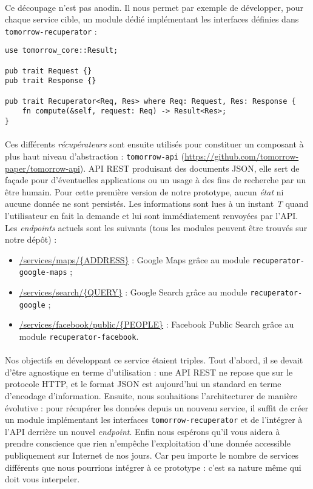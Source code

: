 \paragraph{} Ce découpage n'est pas anodin. Il nous permet par exemple de développer, pour chaque service cible, un module
dédié implémentant les interfaces définies dans \lstinline{tomorrow-recuperator}  :

\begin{lstlisting}
use tomorrow_core::Result;

pub trait Request {}
pub trait Response {}

pub trait Recuperator<Req, Res> where Req: Request, Res: Response {
    fn compute(&self, request: Req) -> Result<Res>;
}\end{lstlisting}

\paragraph{} Ces différents \emph{récupérateurs} sont ensuite utilisés pour constituer un composant à plus haut niveau
d'abstraction : \lstinline{tomorrow-api} (\url{https://github.com/tomorrow-paper/tomorrow-api}). API REST produisant des
documents JSON, elle sert de façade pour d'éventuelles applications ou un usage à des fins de recherche par un être humain. 
Pour cette première version de notre prototype, aucun \emph{état} ni aucune donnée ne sont persistés. Les informations 
sont lues à un instant \emph{T} quand l'utilisateur en fait la demande et lui sont immédiatement renvoyées par l'API.
Les \emph{endpoints} actuels sont les suivants (tous les modules peuvent être trouvés sur notre dépôt) :

\begin{itemize}
    \item \url{/services/maps/{ADDRESS}} : Google Maps grâce au module \lstinline{recuperator-google-maps} ;
    \item \url{/services/search/{QUERY}} : Google Search grâce au module \lstinline{recuperator-google} ;
    \item \url{/services/facebook/public/{PEOPLE}} : Facebook Public Search grâce au module \lstinline{recuperator-facebook}.
\end{itemize}

\paragraph{} Nos objectifs en développant ce service étaient triples. Tout d'abord, il se devait d'être agnostique en terme
d'utilisation : une API REST ne repose que sur le protocole HTTP, et le format JSON est aujourd'hui un standard en terme
d'encodage d'information. Ensuite, nous souhaitions l'architecturer de manière évolutive : pour récupérer les données
depuis un nouveau service, il suffit de créer un module implémentant les interfaces \lstinline{tomorrow-recuperator} et
de l'intégrer à l'API derrière un nouvel \emph{endpoint}. Enfin nous espérons qu'il vous aidera à prendre conscience que
rien n'empêche l'exploitation d'une donnée accessible publiquement sur Internet de nos jours. Car peu importe le nombre
de services différents que nous pourrions intégrer à ce prototype : c'est sa nature même qui doit vous interpeler.